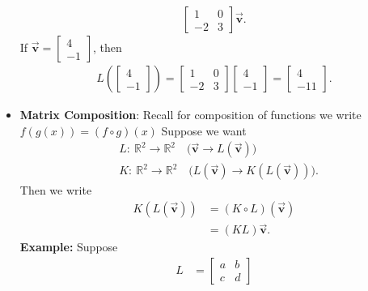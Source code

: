 \documentclass{report}
\begin{document}
\begin{itemize}
\begin{align*}
                \begin{bmatrix}
                    1 & 0 \\ -2 & 3
                \end{bmatrix} \vec{\mathbf{v}}
            .\end{align*}
            If $\vec{\mathbf{v}} = \begin{bmatrix} 4 \\ -1\end{bmatrix} $, then
            \begin{align*}
                L\left( \begin{bmatrix} 4 \\ -1 \end{bmatrix}\right) = \begin{bmatrix} 1 & 0 \\ -2 & 3\end{bmatrix} \begin{bmatrix} 4 \\ -1\end{bmatrix} = \begin{bmatrix}4 \\ -11\end{bmatrix}
            .\end{align*}
        \item \textbf{Matrix Composition}: Recall for composition of functions we write $f(g(x)) = (f\circ g)(x)$
            \bigbreak \noindent 
            Suppose we want
            \begin{align*}
                &L:\ \mathbb{R}^{2} \to \mathbb{R}^{2} \quad \text{($\vec{\mathbf{v}} \to L(\vec{\mathbf{v}})$)} \\
                &K:\ \mathbb{R}^{2} \to \mathbb{R}^{2} \quad \text{($L(\vec{\mathbf{v}}) \to K(L(\vec{\mathbf{v}}))$)}
            .\end{align*}
            Then we write 
            \begin{align*}
                K(L(\vec{\mathbf{v}}))  &= (K \circ L)(\vec{\mathbf{v}}) \\
                                        &= (KL)\vec{\mathbf{v}}
            .\end{align*}
            \bigbreak \noindent 
            \textbf{Example:} Suppose
            \begin{align*}
                L &= \begin{bmatrix} a & b \\ c& d\end{bmatrix} \\

\end{align*}
\end{itemize}
\end{document}
